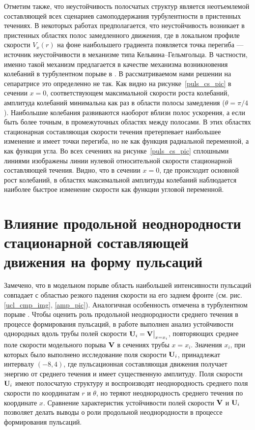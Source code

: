Отметим также, что неустойчивость полосчатых структур является неотъемлемой составляющей всех сценариев самоподдержания турбулентности в пристенных течениях. В некоторых работах предполагается, что неустойчивость возникает в пристенных областях полос замедленного движения, где в локальном профиле скорости $V_x(r)$ на фоне наибольшего градиента появляется точка перегиба --- источник неустойчивости в механизме типа Кельвина--Гельмгольца. В частности, именно такой механизм предлагается в качестве механизма возникновения колебаний в турбулентном порыве в \cite{Shimizu2009}. В рассматриваемом нами решении на сепаратрисе это определенно не так. Как видно на рисунке~\ref{puls_cs_pic} в сечении $x=0$, соответствующем максимальной скорости роста колебаний, амплитуда колебаний минимальна как раз в области полосы замедления ($\theta=\pi/4$). Наибольшие колебания развиваются наоборот вблизи полос ускорения, а если быть более точным, в промежуточных областях между полосами. В этих областях стационарная составляющая скорости течения претерпевает наибольшее изменение и имеет точки перегиба, но не как функция радиальной переменной, а как функция угла. Во всех сечениях на рисунке~\ref{puls_cs_pic} сплошными линиями изображены линии нулевой относительной скорости стационарной составляющей течения. Видно, что в сечении $x=0$, где происходит основной рост колебаний, в областях максимальной амплитуды колебаний наблюдается наиболее быстрое изменение скорости как функции угловой переменной.



\section{Влияние продольной неоднородности стационарной составляющей движения на форму пульсаций}

Замечено, что в модельном порыве область наибольшей интенсивности пульсаций совпадает с областью резкого падения скорости на его заднем фронте (см. рис. \ref{ucl_cmp_img}, \ref{amp_pic}). Аналогичная особенность отмечена в турбулентном порыве \cite{Hof2010}. Чтобы оценить роль продольной неоднородности среднего течения в процессе формирования пульсаций, в работе выполнен анализ устойчивости однородных вдоль трубы полей скорости $\mathbf{U}_i = \mathbf{V}\big|_{x=x_i}$, повторяющих среднее поле скорости модельного порыва $\mathbf{V}$ в сечениях трубы $x = x_i$. Значения $x_i$, при которых было выполнено исследование поля скорости $\mathbf{U}_i$, принадлежат интервалу $(-8,4)$, где пульсационная составляющая движения получает энергию от среднего течения и имеет существенную амплитуду. Поля скорости $\mathbf{U}_i$ имеют полосчатую структуру и воспроизводят неоднородность среднего поля скорости по координатам $r$ и $\theta$, но теряют неоднородность среднего течения по координате $x$. Сравнение характеристик устойчивости полей скорости $\mathbf{V}$ и $\mathbf{U}_i$ позволяет делать выводы о роли продольной неоднородности в процессе формирования пульсаций. 

